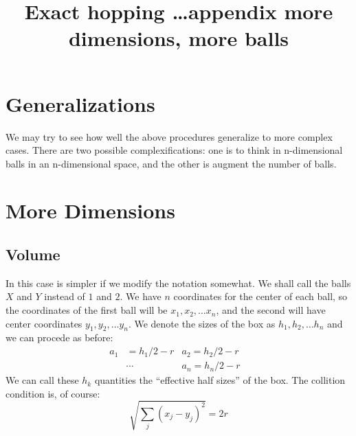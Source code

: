\documentclass[superscriptaddress,pre,reprint,showpacs,onecolumn]{revtex4-1}
\begin{document}
\title{Exact hopping \dots appendix more dimensions, more balls}

\section{Generalizations}

We may try to see how well the above procedures generalize to more
complex cases. There are two possible complexifications: one is
to think in n-dimensional balls in an n-dimensional space, and the
other is augment the number of balls.

\section{More Dimensions}

\subsection{Volume}

In this case is simpler if we modify the notation somewhat. We shall
call the balls $X$ and $Y$ instead of $1$ and $2$. We have $n$ coordinates
for the center of each ball, so the coordinates of the first ball will be
$x_1, x_2, \ldots x_n$, and the second will have center coordinates
$y_1, y_2, \ldots y_n$. We denote the sizes of the box as $h_1, h_2 , \ldots h_n$
and we can procede as before:
\begin{align*}
  a_1&=h_1/2-r & a_2 =h_2/2-r &\\
  &\cdots &       a_n=h_n/2-r &
  \end{align*}
We can call these $h_k$ quantities the ``effective half sizes'' of the box.
The collition condition is, of course:
\begin{equation}
  \sqrt{\sum_j (x_j-y_j)^2} = 2r
\end{equation}
\end{document}
